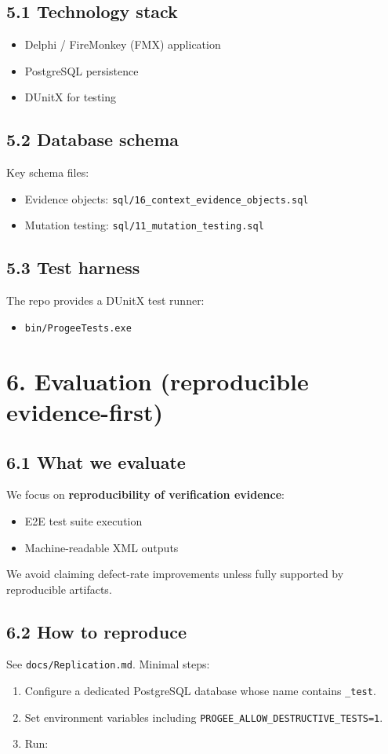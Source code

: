 \documentclass[11pt]{article}
\begin{document}
\subsection{5.1 Technology stack}
\begin{itemize}
\item Delphi / FireMonkey (FMX) application
\item PostgreSQL persistence
\item DUnitX for testing
\end{itemize}

\subsection{5.2 Database schema}
Key schema files:
\begin{itemize}
\item Evidence objects: \texttt{sql/16\_context\_evidence\_objects.sql}
\item Mutation testing: \texttt{sql/11\_mutation\_testing.sql}
\end{itemize}

\subsection{5.3 Test harness}
The repo provides a DUnitX test runner:
\begin{itemize}
\item \texttt{bin/ProgeeTests.exe}
\end{itemize}

\section{6. Evaluation (reproducible evidence-first)}
\subsection{6.1 What we evaluate}
We focus on \textbf{reproducibility of verification evidence}:
\begin{itemize}
\item E2E test suite execution
\item Machine-readable XML outputs
\end{itemize}

We avoid claiming defect-rate improvements unless fully supported by reproducible artifacts.

\subsection{6.2 How to reproduce}
See \texttt{docs/Replication.md}. Minimal steps:
\begin{enumerate}
\item Configure a dedicated PostgreSQL database whose name contains \texttt{\_test}.
\item Set environment variables including \texttt{PROGEE\_ALLOW\_DESTRUCTIVE\_TESTS=1}.
\item Run:
\end{enumerate}
\end{document}
